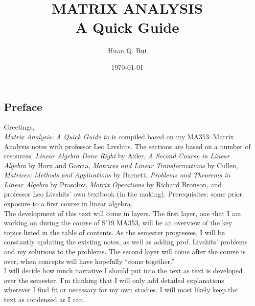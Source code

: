 \documentclass{article}
\theoremstyle{definition}
\begin{document}
	\begin{titlepage}\centering
		\clearpage
		\title{\textsc{\bf{MATRIX ANALYSIS}}\\\smallskip A Quick Guide\\}
		\author{\bigskip Huan Q. Bui}
		\date{\today}
		\maketitle
		\thispagestyle{empty}
	\end{titlepage}

\newpage

\subsection*{Preface}

Greetings,\\

\textit{Matrix Analysis: A Quick Guide to} is compiled based on my MA353: Matrix Analysis notes with professor Leo Livshits. The sections are based on a number of resources: \textit{Linear Algebra Done Right} by Axler, \textit{A Second Course in Linear Algebra} by Horn and Garcia, \textit{Matrices and Linear Transformations} by Cullen, \textit{Matrices: Methods and Applications} by Barnett, \textit{Problems and Theorems in Linear Algebra} by Prasolov, \textit{Matrix Operations} by Richard Bronson, and professor Leo Livshits' own textbook (in the making). Prerequisites: some prior exposure to a first course in linear algebra.\\

The development of this text will come in layers. The first layer, one that I am working on during the course of S'19 MA353, will be an overview of the key topics listed in the table of contents. As the semester progresses, I will be constantly updating the existing notes, as well as adding prof. Livshits' problems and my solutions to the problems. The second layer will come after the course is over, when concepts will have hopefully ``come together.''\\ 

I will decide how much narrative I should put into the text as text is developed over the semester. I'm thinking that I will only add detailed explanations wherever I find fit or necessary for my own studies. I will most likely keep the text as condensed as I can.\\
\end{document}

